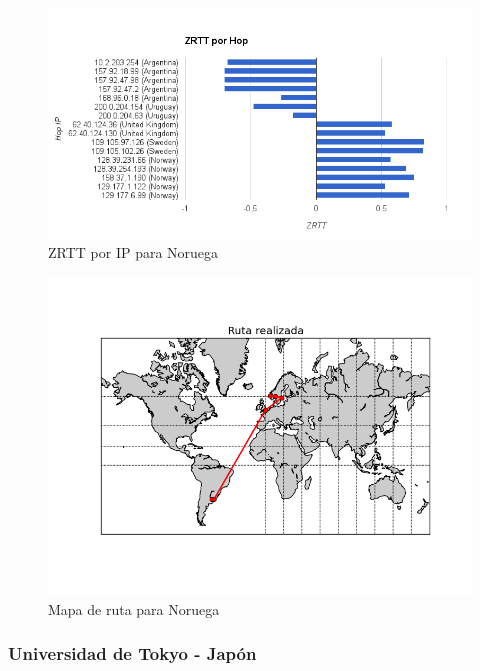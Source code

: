 \begin{figure}[H]
  \centering
    \includegraphics[width=1\textwidth]{../Experimentacion/Noruega/zrtt.png}
    \caption{ZRTT por IP para Noruega}
  \label{zrtt-nor}
\end{figure}

\begin{figure}[H]
  \centering
    \includegraphics[width=1\textwidth]{../Experimentacion/Noruega/map.png}
    \caption{Mapa de ruta para Noruega}
  \label{map-nor}
\end{figure}

\subsubsection{Universidad de Tokyo - Japón}

